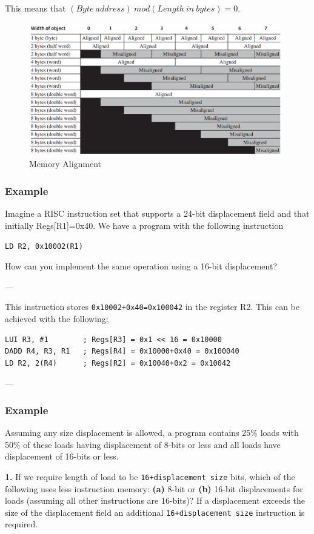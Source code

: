 \documentclass{article}
\begin{document}
 This means that $(Byte\ address)\ mod(Length\ in\ bytes) = 0$.


\begin{figure}[ht!]
\centering
\includegraphics[width=110mm]{img/MemoryAlignment.png}
\caption{Memory Alignment}
\end{figure}




\subsubsection*{Example}

Imagine a RISC instruction set that supports a 24-bit displacement field and that initially Regs[R1]=0x40. We have a program with the following instruction

\texttt{LD R2, 0x10002(R1)}

\noindent How can you implement the same operation using a 16-bit displacement?

---

This instruction stores \texttt{0x10002+0x40=0x100042} in the register R2. This can be achieved with the following:

\begin{verbatim}
LUI R3, #1        ; Regs[R3] = 0x1 << 16 = 0x10000
DADD R4, R3, R1   ; Regs[R4] = 0x10000+0x40 = 0x100040
LD R2, 2(R4)      ; Regs[R2] = 0x10040+0x2 = 0x10042
\end{verbatim}

---

\subsubsection*{Example}

Assuming any size displacement is allowed, a program contains 25\% loads with 50\% of these loads having displacement of 8-bits or less and all loads have displacement of 16-bits or less. 

\textbf{1. }If we require length of load to be \texttt{16+displacement size} bits, which of the following uses less instruction memory: \textbf{(a)} 8-bit or \textbf{(b)} 16-bit displacements for loads (assuming all other instructions are 16-bits)? If a displacement exceeds the size of the displacement field an additional \texttt{16+displacement size} instruction is required. 
\end{document}
